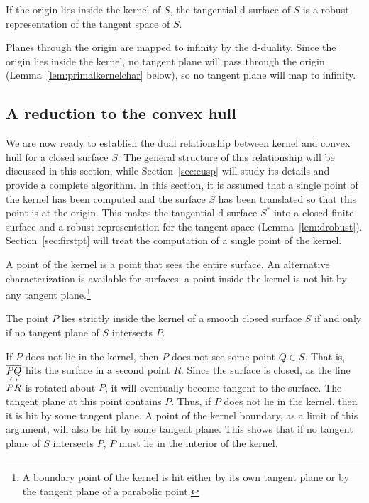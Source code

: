 \documentclass[doublespacing]{elsart}
\begin{document}
\begin{lemma}
\label{lem:drobust}
If the origin lies inside the kernel of $S$,
the tangential d-surface of $S$ is a robust representation of the tangent space of $S$.
\end{lemma}
\prf
Planes through the origin are mapped to infinity by the d-duality.
Since the origin lies inside the kernel,
no tangent plane will pass through the origin (Lemma~\ref{lem:primalkernelchar} below), 
so no tangent plane will map to infinity.
\QED


\subsection{A reduction to the convex hull}
\label{sec:reduction}

We are now ready to establish the dual relationship between kernel and convex hull
for a closed surface $S$.
The general structure of this relationship will be discussed in this section,
while Section~\ref{sec:cusp} will study its details and provide a complete algorithm.
In this section, it is assumed that a single point of the kernel has been computed and the surface $S$
has been translated so that this point is at the origin.
This makes the tangential d-surface $S^*$ into a closed finite surface
and a robust representation for the tangent space (Lemma~\ref{lem:drobust}).
Section~\ref{sec:firstpt} will treat the computation of a single point of the kernel.

A point of the kernel is a point that sees the entire surface.
An alternative characterization is available for surfaces:
a point inside the kernel is not hit by any tangent
plane.\footnote{A boundary point of the kernel is hit
either by its own tangent plane or by the tangent plane of a parabolic point.}

\begin{lemma}
\label{lem:primalkernelchar}
The point $P$ lies strictly inside the kernel of a smooth closed surface $S$ if and only if 
no tangent plane of $S$ intersects $P$.
\end{lemma}
\prf
If $P$ does not lie in the kernel,
then $P$ does not see some point $Q \in S$.
That is, $\mbox{$\overline{PQ}$}$ hits the surface in a second point $R$.
Since the surface is closed, 
as the line $\mbox{$\stackrel{\textstyle \leftrightarrow}{PR}$}$ is rotated about $P$,
it will eventually become tangent to the surface.
The tangent plane at this point contains $P$.
Thus, if $P$ does not lie in the kernel, then it is hit by some tangent plane.
A point of the kernel boundary, as a limit of this argument, will also be hit by some tangent plane.
This shows that if no tangent plane of $S$ intersects $P$, 
$P$ must lie in the interior of the kernel.
\end{document}
